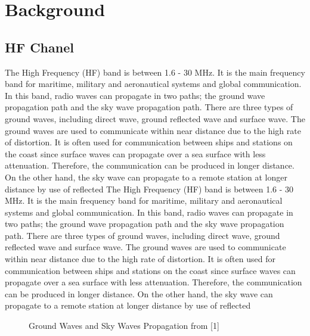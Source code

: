 \documentclass[conference]{IEEEtran}
\begin{document}
\section{Background}
	\subsection{HF Chanel}
The High Frequency (HF) band is between 1.6 - 30 MHz. It is the main frequency band for maritime, military and aeronautical systems and global communication. In this band, radio waves can propagate in two paths; the ground wave propagation path and the sky wave propagation path. There are three types of ground waves, including direct wave, ground reflected wave and surface wave. The ground waves are used to communicate within near distance due to the high rate of distortion. It is often used for communication between ships and stations on the coast since surface waves can propagate over a sea surface with less attenuation. Therefore, the communication can be produced in longer distance. On the other hand, the sky wave can propagate to a remote station at longer distance by use of reflected 
The High Frequency (HF) band is between 1.6 - 30 MHz. It is the main frequency band for maritime, military and aeronautical systems and global communication. In this band, radio waves can propagate in two paths; the ground wave propagation path and the sky wave propagation path. There are three types of ground waves, including direct wave, ground reflected wave and surface wave. The ground waves are used to communicate within near distance due to the high rate of distortion. It is often used for communication between ships and stations on the coast since surface waves can propagate over a sea surface with less attenuation. Therefore, the communication can be produced in longer distance. On the other hand, the sky wave can propagate to a remote station at longer distance by use of reflected 

\begin{figure}[h!]
	\centering
	\caption{Ground Waves and Sky Waves Propagation from [1]}
\end{figure}
\end{document}
